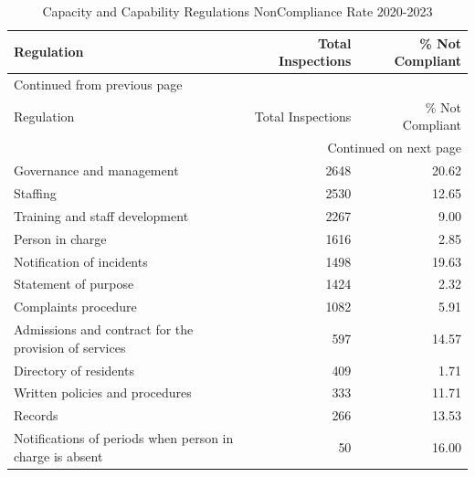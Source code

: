\documentclass[a4paper,11pt,twoside]{article}
\begin{document}
\clearpage
\begin{longtable}{lrr}
\caption{Capacity and Capability Regulations NonCompliance Rate 2020-2023}
\\[0pt]
Regulation & Total Inspections & \% Not Compliant\\[0pt]
\hline
\endfirsthead
\multicolumn{3}{l}{Continued from previous page} \\[0pt]
\hline

Regulation & Total Inspections & \% Not Compliant \\[0pt]

\hline
\endhead
\hline\multicolumn{3}{r}{Continued on next page} \\
\endfoot
\endlastfoot
\hline
Governance and management & 2648 & 20.62\\[0pt]
Staffing & 2530 & 12.65\\[0pt]
Training and staff development & 2267 & 9.00\\[0pt]
Person in charge & 1616 & 2.85\\[0pt]
Notification of incidents & 1498 & 19.63\\[0pt]
Statement of purpose & 1424 & 2.32\\[0pt]
Complaints procedure & 1082 & 5.91\\[0pt]
Admissions and contract for the provision of services & 597 & 14.57\\[0pt]
Directory of residents & 409 & 1.71\\[0pt]
Written policies and procedures & 333 & 11.71\\[0pt]
Records & 266 & 13.53\\[0pt]
Notifications of periods when person in charge is absent & 50 & 16.00\\[0pt]
\end{longtable}
\end{document}
